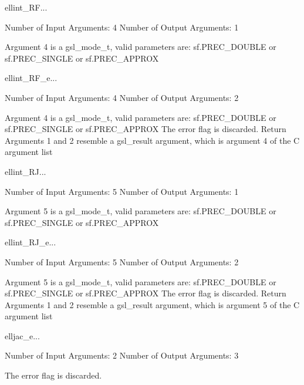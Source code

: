 \begin{funcdesc}{ellint_RF}{...}

    Number of Input  Arguments:  4
    Number of Output Arguments:  1

 Argument 4 is a gsl_mode_t, valid parameters are:
	sf.PREC_DOUBLE or sf.PREC_SINGLE or sf.PREC_APPROX

\end{funcdesc}

\begin{funcdesc}{ellint_RF_e}{...}

    Number of Input  Arguments:  4
    Number of Output Arguments:  2

 Argument 4 is a gsl_mode_t, valid parameters are:
	sf.PREC_DOUBLE or sf.PREC_SINGLE or sf.PREC_APPROX
The error flag is discarded.
Return Arguments 1 and 2 resemble a gsl_result argument,
	which is  argument 4 of the C argument list

\end{funcdesc}

\begin{funcdesc}{ellint_RJ}{...}

    Number of Input  Arguments:  5
    Number of Output Arguments:  1

 Argument 5 is a gsl_mode_t, valid parameters are:
	sf.PREC_DOUBLE or sf.PREC_SINGLE or sf.PREC_APPROX

\end{funcdesc}

\begin{funcdesc}{ellint_RJ_e}{...}

    Number of Input  Arguments:  5
    Number of Output Arguments:  2

 Argument 5 is a gsl_mode_t, valid parameters are:
	sf.PREC_DOUBLE or sf.PREC_SINGLE or sf.PREC_APPROX
The error flag is discarded.
Return Arguments 1 and 2 resemble a gsl_result argument,
	which is  argument 5 of the C argument list

\end{funcdesc}

\begin{funcdesc}{elljac_e}{...}

    Number of Input  Arguments:  2
    Number of Output Arguments:  3

The error flag is discarded.

\end{funcdesc}

